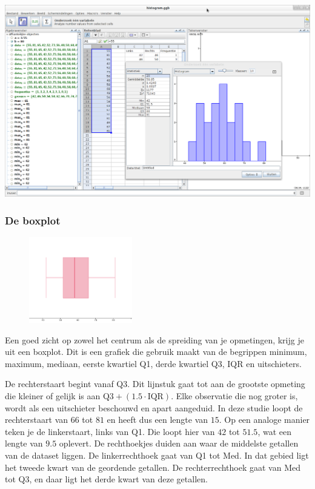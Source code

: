 \documentclass[12pt,twoside]{article}
\begin{document}
\begin{center}
  \includegraphics[width=14cm]{gg-1var_stat}
\end{center}

\subsubsection{De boxplot}

\begin{figure}
  \vspace{-1cm}
  \includegraphics[width=0.4\textwidth]{boxplot}
\end{figure}

Een goed zicht op zowel het centrum als de spreiding van je opmetingen, krijg je uit een boxplot. Dit
is een grafiek die gebruik maakt van de begrippen minimum, maximum, mediaan, eerste kwartiel
Q1, derde kwartiel Q3, IQR en uitschieters.

De rechterstaart begint vanaf Q3. Dit lijnstuk gaat tot aan de grootste opmeting die kleiner of
gelijk is aan $\mbox{Q3} + (1.5\cdot\mbox{IQR})$. Elke observatie die nog groter is, wordt als een uitschieter
beschouwd en apart aangeduid. In deze studie loopt de rechterstaart van $66$ tot $81$ en heeft
dus een lengte van $15$. Op een analoge manier teken je de linkerstaart, links van Q1. Die
loopt hier van $42$ tot $51.5$, wat een lengte van $9.5$ oplevert.
De rechthoekjes duiden aan waar de middelste getallen van de dataset liggen. De
linkerrechthoek gaat van Q1 tot Med. In dat gebied ligt het tweede kwart van de geordende
getallen. De rechterrechthoek gaat van Med tot Q3, en daar ligt het derde kwart van deze
getallen.
\end{document}
